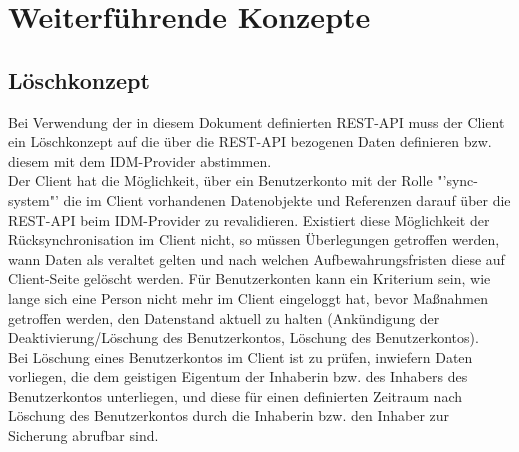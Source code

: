 \chapter{Weiterführende Konzepte}

\section{Löschkonzept}

Bei Verwendung der in diesem Dokument definierten REST-API muss der Client ein Löschkonzept auf die über die REST-API bezogenen Daten definieren bzw. diesem mit dem IDM-Provider abstimmen.\\

Der Client hat die Möglichkeit, über ein Benutzerkonto mit der Rolle "'sync-system"' die im Client vorhandenen Datenobjekte und Referenzen darauf über die REST-API beim IDM-Provider zu revalidieren. 
Existiert diese Möglichkeit der Rücksynchronisation im Client nicht, so müssen Überlegungen getroffen werden, wann Daten als veraltet gelten und nach welchen Aufbewahrungsfristen diese auf Client-Seite gelöscht werden. 
Für Benutzerkonten kann ein Kriterium sein, wie lange sich eine Person nicht mehr im Client eingeloggt hat, bevor Maßnahmen getroffen werden, den Datenstand aktuell zu halten (Ankündigung der Deaktivierung/Löschung des Benutzerkontos, Löschung des Benutzerkontos). \\

Bei Löschung eines Benutzerkontos im Client ist zu prüfen, inwiefern Daten vorliegen, die dem geistigen Eigentum der Inhaberin bzw. des Inhabers des Benutzerkontos unterliegen, und diese für einen definierten Zeitraum nach Löschung des Benutzerkontos durch die Inhaberin bzw. den Inhaber zur Sicherung abrufbar sind.